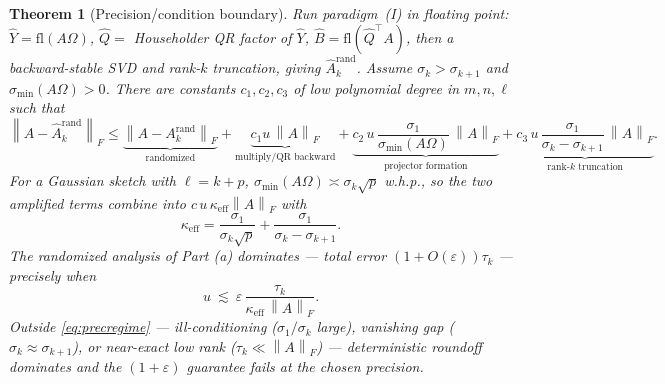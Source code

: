 \documentclass{amsart}
\newtheorem{theorem}{Theorem}
\theoremstyle{definition}
\newcommand{\Frob}[1]{\left\lVert #1\right\rVert_F}
\begin{document}
\begin{theorem}[Precision/condition boundary]\label{thm:precision}
Run paradigm~(I) in floating point: $\widehat Y=\mathrm{fl}(A\Omega)$,
$\widehat Q=$ Householder QR factor of $\widehat Y$,
$\widehat B=\mathrm{fl}(\widehat Q^\top A)$, then a backward-stable SVD and
rank-$k$ truncation, giving $\widehat A_k^{\mathrm{rand}}$. Assume
$\sigma_k>\sigma_{k+1}$ and $\sigma_{\min}(A\Omega)>0$. There are constants
$c_1,c_2,c_3$ of low polynomial degree in $m,n,\ell$ such that
\begin{equation}\label{eq:fperr}
\Frob{A-\widehat A_k^{\mathrm{rand}}}
\le\underbrace{\Frob{A-A_k^{\mathrm{rand}}}}_{\text{randomized}}
+\underbrace{c_1 u\,\Frob A}_{\text{multiply/QR backward}}
+\underbrace{c_2\,u\,\frac{\sigma_1}{\sigma_{\min}(A\Omega)}\,\Frob A}_{\text{projector formation}}
+\underbrace{c_3\,u\,\frac{\sigma_1}{\sigma_k-\sigma_{k+1}}\,\Frob A}_{\text{rank-$k$ truncation}} .
\end{equation}
For a Gaussian sketch with $\ell=k+p$, $\sigma_{\min}(A\Omega)\asymp\sigma_k\sqrt p$
w.h.p., so the two amplified terms combine into $c\,u\,\kappa_{\mathrm{eff}}\Frob A$
with
\begin{equation}\label{eq:keff}
\kappa_{\mathrm{eff}}=\frac{\sigma_1}{\sigma_k\sqrt p}+\frac{\sigma_1}{\sigma_k-\sigma_{k+1}} .
\end{equation}
The randomized analysis of Part (a) dominates --- total error
$(1+O(\varepsilon))\tau_k$ --- precisely when
\begin{equation}\label{eq:precregime}
u\ \lesssim\ \varepsilon\,\frac{\tau_k}{\kappa_{\mathrm{eff}}\,\Frob A} .
\end{equation}
Outside \eqref{eq:precregime} --- ill-conditioning ($\sigma_1/\sigma_k$ large),
vanishing gap ($\sigma_k\approx\sigma_{k+1}$), or near-exact low rank
($\tau_k\ll\Frob A$) --- deterministic roundoff dominates and the
$(1+\varepsilon)$ guarantee fails at the chosen precision.
\end{theorem}
\end{document}
